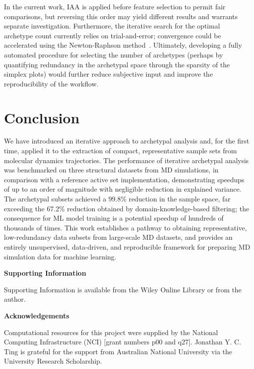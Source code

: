 \documentclass{WileyMSP-template}
\begin{document}
In the current work, IAA is applied before feature selection to permit fair comparisons, but reversing this order may yield different results and warrants separate investigation. Furthermore, the iterative search for the optimal archetype count currently relies on trial-and-error; convergence could be accelerated using the Newton-Raphson method~\cite{Meza2011NewtonRaphson}. Ultimately, developing a fully automated procedure for selecting the number of archetypes (perhaps by quantifying redundancy in the archetypal space through the sparsity of the simplex plots) would further reduce subjective input and improve the reproducibility of the workflow.


\section{Conclusion}
\label{sec:conclusion}

We have introduced an iterative approach to archetypal analysis and, for the first time, applied it to the extraction of compact, representative sample sets from molecular dynamics trajectories. The performance of iterative archetypal analysis was benchmarked on three structural datasets from MD simulations, in comparison with a reference active set implementation, demonstrating speedups of up to an order of magnitude with negligible reduction in explained variance. The archetypal subsets achieved a 99.8\% reduction in the sample space, far exceeding the 67.2\% reduction obtained by domain-knowledge-based filtering; the consequence for ML model training is a potential speedup of hundreds of thousands of times. This work establishes a pathway to obtaining representative, low-redundancy data subsets from large-scale MD datasets, and provides an entirely unsupervised, data-driven, and reproducible framework for preparing MD simulation data for machine learning.\par



\medskip
\textbf{Supporting Information} \par
Supporting Information is available from the Wiley Online Library or from the author.



\medskip
\textbf{Acknowledgements} \par
Computational resources for this project were supplied by the National Computing Infrastructure (NCI) [grant numbers p00 and q27]. Jonathan Y. C. Ting is grateful for the support from Australian National University via the University Research Scholarship. 
\end{document}
